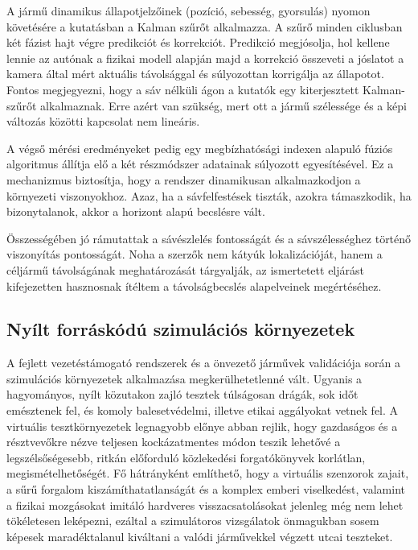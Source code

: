 A jármű dinamikus állapotjelzőinek (pozíció, sebesség, gyorsulás) nyomon
követésére a kutatásban a Kalman szűrőt alkalmazza. A szűrő minden
ciklusban két fázist hajt végre predikciót és korrekciót. Predikció
megjósolja, hol kellene lennie az autónak a fizikai modell alapján majd
a korrekció összeveti a jóslatot a kamera által mért aktuális
távolsággal és súlyozottan korrigálja az állapotot. Fontos megjegyezni,
hogy a sáv nélküli ágon a kutatók egy kiterjesztett Kalman-szűrőt
alkalmaznak. Erre azért van szükség, mert ott a jármű szélessége és a
képi változás közötti kapcsolat nem lineáris.

A végső mérési eredményeket pedig egy megbízhatósági indexen alapuló
fúziós algoritmus állítja elő a két részmódszer adatainak súlyozott
egyesítésével. Ez a mechanizmus biztosítja, hogy a rendszer dinamikusan
alkalmazkodjon a környezeti viszonyokhoz. Azaz, ha a sávfelfestések
tiszták, azokra támaszkodik, ha bizonytalanok, akkor a horizont alapú
becslésre vált.

Összességében jó rámutattak a sávészlelés fontosságát és a
sávszélességhez történő viszonyítás pontosságát. Noha a szerzők nem
kátyúk lokalizációját, hanem a céljármű távolságának meghatározását
tárgyalják, az ismertetett eljárást kifejezetten hasznosnak ítéltem a
távolságbecslés alapelveinek megértéséhez.

\subsection{Nyílt forráskódú szimulációs környezetek}

A fejlett vezetéstámogató rendszerek és a önvezető járművek validációja során a szimulációs környezetek alkalmazása megkerülhetetlenné vált. Ugyanis a hagyományos, nyílt közutakon zajló tesztek túlságosan drágák, sok időt emésztenek fel, és komoly balesetvédelmi, illetve etikai aggályokat vetnek fel. A virtuális tesztkörnyezetek legnagyobb előnye abban rejlik, hogy gazdaságos és a résztvevőkre nézve teljesen kockázatmentes módon teszik lehetővé a legszélsőségesebb, ritkán előforduló közlekedési forgatókönyvek korlátlan, megismételhetőségét. Fő hátrányként említhető, hogy a virtuális szenzorok zajait, a sűrű forgalom kiszámíthatatlanságát és a komplex emberi viselkedést, valamint a fizikai mozgásokat imitáló hardveres visszacsatolásokat jelenleg még nem lehet tökéletesen leképezni, ezáltal a szimulátoros vizsgálatok önmagukban sosem képesek maradéktalanul kiváltani a valódi járművekkel végzett utcai teszteket.\cite{nezhadDrivingSimulatorsAutonomous}
 
